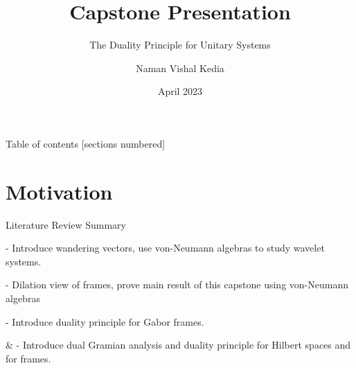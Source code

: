 \documentclass{beamer}
\title{Capstone Presentation}
\subtitle{The Duality Principle for Unitary Systems}
\author{Naman Vishal Kedia}
\date{April 2023}
\begin{document}
\maketitle

\begin{frame}{Table of contents}
  [sections numbered]
  \tableofcontents%
\end{frame}






\section{Motivation}

\begin{frame}{Literature Review Summary}

\textbf{\cite{dai1998wandering}} - Introduce wandering vectors, use von-Neumann algebras to study wavelet systems.

\textbf{\cite{HL2000}} - Dilation view of frames, prove main result of this capstone using von-Neumann algebras

\textbf{\cite{ron1995frames}} - Introduce duality principle for Gabor frames.

\textbf{\cite{fan2016dual}} \& \textbf{\cite{Fan2016}} - Introduce dual Gramian analysis and duality principle for Hilbert spaces and for frames.
    
\end{frame}
\end{document}
